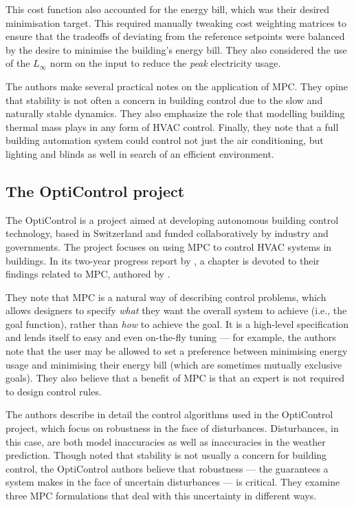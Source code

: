 This cost function also accounted for the energy bill, which was their desired minimisation target.
This required manually tweaking cost weighting matrices to ensure that the tradeoffs of deviating from the reference setpoints were balanced by the desire to minimise the building's energy bill.
They also considered the use of the $L_\infty$ norm on the input to reduce the \emph{peak} electricity usage.

The authors make several practical notes on the application of MPC\@.
They opine that stability is not often a concern in building control due to the slow and naturally stable dynamics.
They also emphasize the role that modelling building thermal mass plays in any form of HVAC control.
Finally, they note that a full building automation system could control not just the air conditioning, but lighting and blinds as well in search of an efficient environment.

\subsection{The OptiControl project}

The OptiControl is a project aimed at developing autonomous building control technology, based in Switzerland and funded collaboratively by industry and governments.
The project focuses on using MPC to control HVAC systems in buildings.
In its two-year progress report by \textcite{Gyalistras10}, a chapter is devoted to their findings related to MPC, authored by \textcite{Oldewurtel10}.

They note that MPC is a natural way of describing control problems, which allows designers to specify \emph{what} they want the overall system to achieve (i.e., the goal function), rather than \emph{how} to achieve the goal.
It is a high-level specification\footnotemark{} and lends itself to easy and even on-the-fly tuning --- for example, the authors note that the user may be allowed to set a preference between minimising energy usage and minimising their energy bill (which are sometimes mutually exclusive goals).
They also believe that a benefit of MPC is that an expert is not required to design control rules.


The authors describe in detail the control algorithms used in the OptiControl project, which focus on robustness in the face of disturbances.
Disturbances, in this case, are both model inaccuracies as well as inaccuracies in the weather prediction.
Though  noted that stability is not usually a concern for building control, the OptiControl authors believe that robustness --- the guarantees a system makes in the face of uncertain disturbances --- is critical.
They examine three MPC formulations that deal with this uncertainty in different ways.

